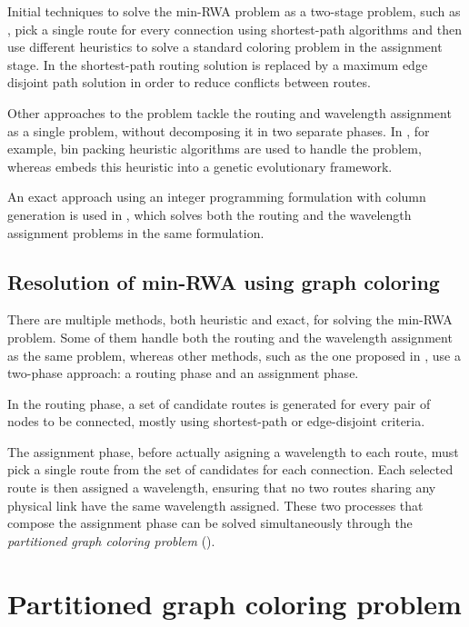 Initial techniques to solve the min-RWA problem as a two-stage problem, such as \cite{hyytia14wavelength}, pick a single route for every connection using shortest-path algorithms and then use different heuristics to solve a standard coloring problem in the assignment stage. In \cite{manohar2002routing} the shortest-path routing solution is replaced by a maximum edge disjoint path solution in order to reduce conflicts between routes.

Other approaches to the problem tackle the routing and wavelength assignment as a single problem, without decomposing it in two separate phases. In \cite{skorin2007routing}, for example, bin packing heuristic algorithms are used to handle the problem, whereas \cite{noronha2007random} embeds this heuristic into a genetic evolutionary framework.

An exact approach using an integer programming formulation with column generation is used in \cite{lee2002optimization}, which solves both the routing and the wavelength assignment problems in the same formulation.

\subsection*{Resolution of min-RWA using graph coloring}

There are multiple methods, both heuristic and exact, for solving the min-RWA problem. Some of them handle both the routing and the wavelength assignment as the same problem, whereas other methods, such as the one proposed in \cite{Li00thepartition}, use a two-phase approach: a routing phase and an assignment phase.

In the routing phase, a set of candidate routes is generated for every pair of nodes to be connected, mostly using shortest-path or edge-disjoint criteria.

The assignment phase, before actually asigning a wavelength to each route, must pick a single route from the set of candidates for each connection. Each selected route is then assigned a wavelength, ensuring that no two routes sharing any physical link have the same wavelength assigned. These two processes that compose the assignment phase can be solved simultaneously through the \textit{partitioned graph coloring problem} (\PCP{}).

\section{Partitioned graph coloring problem}

